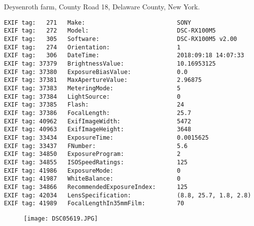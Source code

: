 \section{\protect{}}
\noindent Deysenroth farm, County Road 18, Delaware County, New York.
\noindent
\begin{lstlisting}
EXIF tag:   271   Make:                          SONY
EXIF tag:   272   Model:                         DSC-RX100M5
EXIF tag:   305   Software:                      DSC-RX100M5 v2.00
EXIF tag:   274   Orientation:                   1
EXIF tag:   306   DateTime:                      2018:09:18 14:07:33
EXIF tag: 37379   BrightnessValue:               10.16953125
EXIF tag: 37380   ExposureBiasValue:             0.0
EXIF tag: 37381   MaxApertureValue:              2.96875
EXIF tag: 37383   MeteringMode:                  5
EXIF tag: 37384   LightSource:                   0
EXIF tag: 37385   Flash:                         24
EXIF tag: 37386   FocalLength:                   25.7
EXIF tag: 40962   ExifImageWidth:                5472
EXIF tag: 40963   ExifImageHeight:               3648
EXIF tag: 33434   ExposureTime:                  0.0015625
EXIF tag: 33437   FNumber:                       5.6
EXIF tag: 34850   ExposureProgram:               2
EXIF tag: 34855   ISOSpeedRatings:               125
EXIF tag: 41986   ExposureMode:                  0
EXIF tag: 41987   WhiteBalance:                  0
EXIF tag: 34866   RecommendedExposureIndex:      125
EXIF tag: 42034   LensSpecification:             (8.8, 25.7, 1.8, 2.8)
EXIF tag: 41989   FocalLengthIn35mmFilm:         70

\end{lstlisting}
\clearpage
\begin{figure}
\raggedleft
\texttt{[image: DSC05619.JPG]}
\end{figure}


\clearpage
